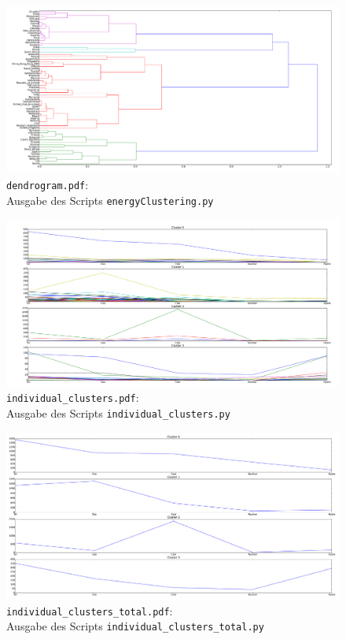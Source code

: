 \documentclass[12pt,a4paper]{scrartcl}
\begin{document}
\newpage
\begin{figure}[!h]
\includegraphics[width=\textwidth]{Plots/dendrogram.pdf}
\caption{\lstinline{dendrogram.pdf}: \\Ausgabe des Scripts \lstinline{energyClustering.py}}
\end{figure}
\begin{figure}[!h]
\includegraphics[width=\textwidth]{Plots/individual_clusters.pdf}
\caption{\lstinline{individual_clusters.pdf}: \\Ausgabe des Scripts \lstinline{individual_clusters.py}}
\end{figure}
\begin{figure}[!h]
\includegraphics[width=\textwidth]{Plots/individual_clusters_total.pdf}
\caption{\lstinline{individual_clusters_total.pdf}: \\Ausgabe des Scripts \lstinline{individual_clusters_total.py}}
\end{figure}
\end{document}
